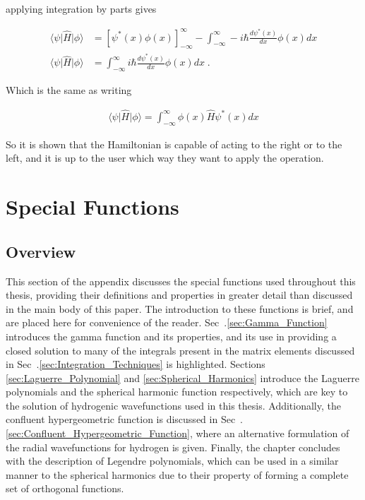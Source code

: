     \noindent applying integration by parts gives 

    \begin{align}
        \langle \psi \vert \hat{H} \vert \phi \rangle &= \left[\psi^*(x) \phi(x) \right]^\infty_{-\infty} - \int_{-\infty}^\infty -i\hbar \frac{d\psi^*(x)}{dx} \phi(x) dx\\
        \langle \psi \vert \hat{H} \vert \phi \rangle &= \int_{-\infty}^\infty i\hbar \frac{d\psi^*(x)}{dx} \phi(x) dx\;.
    \end{align}

    \noindent Which is the same as writing

    \begin{align}
        \langle \psi \vert \hat{H} \vert \phi \rangle = \int^\infty_{-\infty} \phi(x) \hat{H} \psi^*(x) dx
    \end{align}

    \noindent So it is shown that the Hamiltonian is capable of acting to the right or to the left, and it is up to the user which way they want to apply the operation.
\chapter{Special Functions}
    \section{Overview}
        This section of the appendix discusses the special functions used throughout this thesis, providing their definitions and properties in greater detail than discussed in the main body of this paper. The introduction to these functions is brief, and are placed here for convenience of the reader. Sec~.\ref{sec:Gamma_Function} introduces the gamma function and its properties, and its use in providing a closed solution to many of the integrals present in the matrix elements discussed in Sec~.\ref{sec:Integration_Techniques} is highlighted. Sections \ref{sec:Laguerre_Polynomial} and \ref{sec:Spherical_Harmonics} introduce the Laguerre polynomials and the spherical harmonic function respectively, which are key to the solution of hydrogenic wavefunctions used in this thesis. Additionally, the confluent hypergeometric function is discussed in Sec~.\ref{sec:Confluent_Hypergeometric_Function}, where an alternative formulation of the radial wavefunctions for hydrogen is given. Finally, the chapter concludes with the description of Legendre polynomials, which can be used in a similar manner to the spherical harmonics due to their property of forming a complete set of orthogonal functions.
